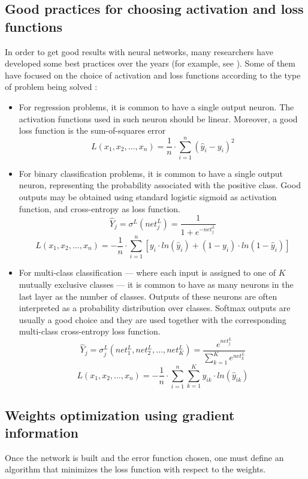         \subsection{Good practices for choosing activation and loss functions}
            In order to get good results with neural networks, many researchers have developed some best practices over the years (for example, see \cite{Simard}). Some of them have focused on the choice of activation and loss functions according to the type of problem being solved \cite[232--236]{Bishop}:
            \begin{itemize}
                \item For regression problems, it is common to have a single output neuron. The activation functions used in such neuron should be linear. Moreover, a good loss function is the sum-of-squares error
                \[L\left(x_1, x_2, \dots, x_n\right) = \frac{1}{n} \cdot \sum_{i=1}^{n}\left(\hat{y}_i - y_i\right)^{2}\]
                \item For binary classification problems, it is common to have a single output neuron, representing the probability associated with the positive class. Good outputs may be obtained using standard logistic sigmoid as activation function, and cross-entropy as loss function.
                \[\hat{Y}_j = \sigma^L\left(net_j^L\right) = \frac{1}{1+e^{-net_j^L}}\]
                \[L\left(x_1, x_2, \dots, x_n\right) = -\frac{1}{n} \cdot \sum_{i=1}^{n}\left[y_i \cdot ln\left(\hat{y}_i\right) + \left(1-y_i\right)\cdot ln\left(1-\hat{y}_i\right)\right]\]
                \item For multi-class classification --- where each input is assigned to one of \(K\) mutually exclusive classes --- it is common to have as many neurons in the last layer as the number of classes. Outputs of these neurons are often interpreted as a probability distribution over classes. Softmax outputs are usually a good choice and they are used together with the corresponding multi-class cross-entropy loss function.
                \[\hat{Y}_j = \sigma_j^L\left(net_1^L, net_2^L, \dots, net_K^L\right) = \frac{e^{net_j^L}}{\sum_{k=1}^{K}e^{net_k^L}}\]
                \[L\left(x_1, x_2, \dots, x_n\right) = -\frac{1}{n} \cdot  \sum_{i=1}^{n}\sum_{k=1}^{K}y_{ik} \cdot ln\left(\hat{y}_{ik}\right)\]
            \end{itemize}
        \subsection{Weights optimization using gradient information}
            Once the network is built and the error function chosen, one must define an algorithm that minimizes the loss function with respect to the weights.
            
